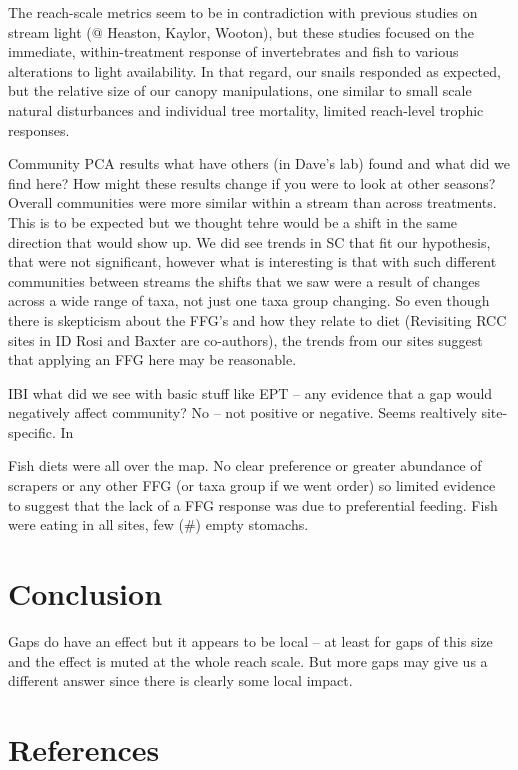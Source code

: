 \documentclass[double,12pt]{beavtex}
\begin{document}
  The reach-scale metrics seem to be in contradiction with previous
  studies on stream light (@ Heaston, Kaylor, Wooton), but these studies
  focused on the immediate, within-treatment response of invertebrates and
  fish to various alterations to light availability. In that regard, our
  snails responded as expected, but the relative size of our canopy
  manipulations, one similar to small scale natural disturbances and
  individual tree mortality, limited reach-level trophic responses.
  
  Community PCA results what have others (in Dave's lab) found and what
  did we find here? How might these results change if you were to look at
  other seasons? Overall communities were more similar within a stream
  than across treatments. This is to be expected but we thought tehre
  would be a shift in the same direction that would show up. We did see
  trends in SC that fit our hypothesis, that were not significant, however
  what is interesting is that with such different communities between
  streams the shifts that we saw were a result of changes across a wide
  range of taxa, not just one taxa group changing. So even though there is
  skepticism about the FFG's and how they relate to diet (Revisiting RCC
  sites in ID Rosi and Baxter are co-authors), the trends from our sites
  suggest that applying an FFG here may be reasonable.
  
  IBI what did we see with basic stuff like EPT -- any evidence that a gap
  would negatively affect community? No -- not positive or negative. Seems
  realtively site-specific. In
  
  Fish diets were all over the map. No clear preference or greater
  abundance of scrapers or any other FFG (or taxa group if we went order)
  so limited evidence to suggest that the lack of a FFG response was due
  to preferential feeding. Fish were eating in all sites, few (\#) empty
  stomachs.
  
  \chapter{Conclusion}\label{conclusion}
  
  Gaps do have an effect but it appears to be local -- at least for gaps
  of this size and the effect is muted at the whole reach scale. But more
  gaps may give us a different answer since there is clearly some local
  impact.
  
  \pagebreak
  
  \chapter*{References}\label{references}
  
\end{document}
